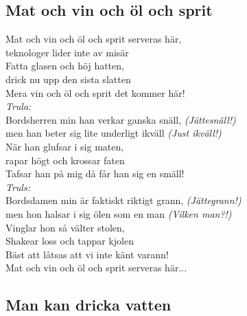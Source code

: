 \newpage

\subsection*{Mat och vin och öl och sprit} 

\noindent Mat och vin och öl och sprit serveras här,\\
\noindent teknologer lider inte av misär\\
\noindent Fatta glasen och höj hatten,\\
\noindent drick nu upp den sista slatten\\
\noindent Mera vin och öl och sprit det kommer här!\\

\noindent \textit{Trula:}\\
\noindent Bordsherren min han verkar ganska snäll, \textit{(Jättesnäll!)}\\
\noindent men han beter sig lite underligt ikväll \textit{(Just ikväll!)}\\
\noindent När han glufsar i sig maten,\\
\noindent rapar högt och krossar faten\\
\noindent Tafsar han på mig då får han sig en smäll!\\

\noindent \textit{Truls:}\\
\noindent Bordsdamen min är faktiskt riktigt grann, \textit{(Jättegrann!)}\\
\noindent men hon halsar i sig ölen som en man \textit{(Vilken man?!)}\\
\noindent Vinglar hon så välter stolen,\\
\noindent Shakear loss och tappar kjolen\\
\noindent Bäst att låtsas att vi inte känt varann!\\

\noindent Mat och vin och öl och sprit serveras här...\\


\newpage

\subsection*{Man kan dricka vatten} 

